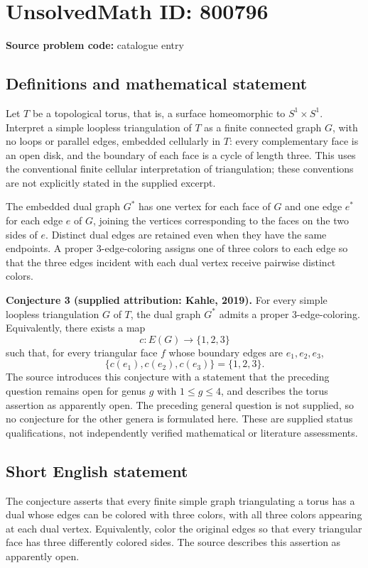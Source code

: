 \documentclass[11pt]{article}
\begin{document}
\section*{UnsolvedMath ID: 800796}
\textbf{Source problem code:} catalogue entry
\subsection{Definitions and mathematical statement}
Let \(T\) be a topological torus, that is, a surface homeomorphic to \(S^1\times S^1\). Interpret a simple loopless triangulation of \(T\) as a finite connected graph \(G\), with no loops or parallel edges, embedded cellularly in \(T\): every complementary face is an open disk, and the boundary of each face is a cycle of length three. This uses the conventional finite cellular interpretation of triangulation; these conventions are not explicitly stated in the supplied excerpt.

The embedded dual graph \(G^*\) has one vertex for each face of \(G\) and one edge \(e^*\) for each edge \(e\) of \(G\), joining the vertices corresponding to the faces on the two sides of \(e\). Distinct dual edges are retained even when they have the same endpoints. A proper \(3\)-edge-coloring assigns one of three colors to each edge so that the three edges incident with each dual vertex receive pairwise distinct colors.

\textbf{Conjecture 3 (supplied attribution: Kahle, 2019).} For every simple loopless triangulation \(G\) of \(T\), the dual graph \(G^*\) admits a proper \(3\)-edge-coloring. Equivalently, there exists a map
\[
 c:E(G)\longrightarrow\{1,2,3\}
\]
such that, for every triangular face \(f\) whose boundary edges are \(e_1,e_2,e_3\),
\[
 \{c(e_1),c(e_2),c(e_3)\}=\{1,2,3\}.
\]
The source introduces this conjecture with a statement that the preceding question remains open for genus \(g\) with \(1\leq g\leq4\), and describes the torus assertion as apparently open. The preceding general question is not supplied, so no conjecture for the other genera is formulated here. These are supplied status qualifications, not independently verified mathematical or literature assessments.
\subsection{Short English statement}
The conjecture asserts that every finite simple graph triangulating a torus has a dual whose edges can be colored with three colors, with all three colors appearing at each dual vertex. Equivalently, color the original edges so that every triangular face has three differently colored sides. The source describes this assertion as apparently open.
\end{document}
